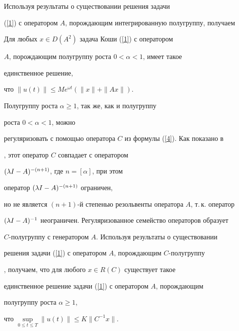 Используя результаты \cite{Neubrander} о существовании решения задачи


(\ref{1}) с оператором $A$, порождающим интегрированную полугруппу, получаем





\begin{cornonum}


Для любых $x\in D(A^2)$  задача Коши (\ref{1}) с оператором


$A$, порождающим полугруппу роста $0<\alpha <1$, имеет такое 


единственное решение,


что $\|u(t)\|\leq Me^{\omega t}(\|x\|+\|Ax\|)$.


\end{cornonum}





\begin{notenonum}


Полугруппу роста $\alpha\geq 1$, так же, как и полугруппу 


роста $0<\alpha<1$, можно


регуляризовать с помощью оператора $C$ из формулы (\ref{4}). Как показано в


\cite{Okazawa}, этот оператор $C$ совпадает с оператором


$(\lambda I-A)^{-(n+1)}$, где $n=[\alpha]$, при этом


оператор $(\lambda I-A)^{-(n+1)}$ ограничен,


но не является $(n+1)$-й степенью резольвенты оператора $A$, т.\,к. оператор


$(\lambda I-A)^{-1}$ неограничен. Регуляризованное семейство операторов образует


$C$-полугруппу с генератором $A$. Используя результаты о существовании


решения задачи (\ref{1}) с оператором $A$, порождающим $C$-полугруппу


\cite{Tanaka1}, получаем, что для любого $x\in R(C)$ существует такое


единственное решение задачи (\ref{1}) с оператором $A$, порождающим 


полугруппу роста $\alpha\geq1$,


что $\sup\limits_{0\leq t\leq T}\|u(t)\|\leq K\|C^{-1}x\|$.


\end{notenonum}





